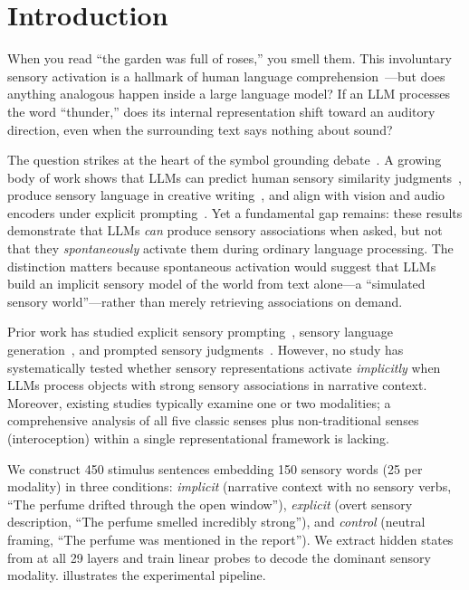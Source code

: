 \section{Introduction}
\label{sec:intro}

When you read ``the garden was full of roses,'' you smell them. This involuntary sensory activation is a hallmark of human language comprehension~\citep{barsalou1999perceptual}---but does anything analogous happen inside a large language model? If an LLM processes the word ``thunder,'' does its internal representation shift toward an auditory direction, even when the surrounding text says nothing about sound?

The question strikes at the heart of the symbol grounding debate~\citep{harnad1990symbol}. A growing body of work shows that LLMs can predict human sensory similarity judgments~\citep{marjieh2023large}, produce sensory language in creative writing~\citep{hicke2025zero}, and align with vision and audio encoders under explicit prompting~\citep{wang2025words}. Yet a fundamental gap remains: these results demonstrate that LLMs \emph{can} produce sensory associations when asked, but not that they \emph{spontaneously} activate them during ordinary language processing. The distinction matters because spontaneous activation would suggest that LLMs build an implicit sensory model of the world from text alone---a ``simulated sensory world''---rather than merely retrieving associations on demand.

Prior work has studied explicit sensory prompting~\citep{wang2025words}, sensory language generation~\citep{hicke2025zero}, and prompted sensory judgments~\citep{marjieh2023large, lee2025exploring}. However, no study has systematically tested whether sensory representations activate \emph{implicitly} when LLMs process objects with strong sensory associations in narrative context. Moreover, existing studies typically examine one or two modalities; a comprehensive analysis of all five classic senses plus non-traditional senses (\eg interoception) within a single representational framework is lacking.

We construct 450 stimulus sentences embedding 150 sensory words (25 per modality) in three conditions: \emph{implicit} (narrative context with no sensory verbs, \eg ``The perfume drifted through the open window''), \emph{explicit} (overt sensory description, \eg ``The perfume smelled incredibly strong''), and \emph{control} (neutral framing, \eg ``The perfume was mentioned in the report''). We extract hidden states from \qwen at all 29 layers and train linear probes to decode the dominant sensory modality.  illustrates the experimental pipeline.

